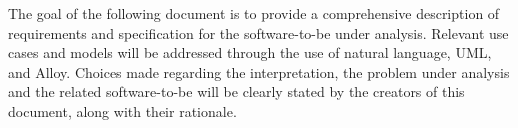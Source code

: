 \documentclass[../../main.tex]{subfiles}
\begin{document}
The goal of the following document is to provide a comprehensive description of requirements and specification for the software-to-be under analysis. Relevant use cases and models will be addressed through the use of natural language, UML, and Alloy. Choices made regarding the interpretation, the problem under analysis and the related software-to-be will be clearly stated by the creators of this document, along with their rationale.
\end{document}
